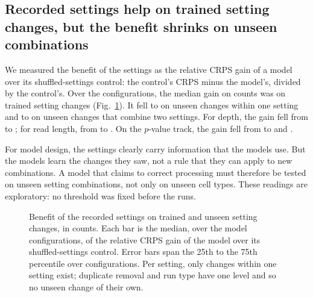 \documentclass[pdflatex,sn-mathphys-num]{sn-jnl}
\newcommand{\lit}[1]{#1}
\begin{document}
\subsection{Recorded settings help on trained setting changes, but the benefit shrinks on unseen combinations}\label{sec:r4}

We measured the benefit of the settings as the relative CRPS gain of a model over its
shuffled-settings control: the control's CRPS minus the model's, divided by the control's.
Over the \nGenCfg{} configurations, the median gain on counts was \relCntTr{} on trained
setting changes (Fig.~\ref{fig:gen}). It fell to \relCntSame{} on unseen changes within one
setting and to \relCntCross{} on unseen changes that combine two settings. For depth, the gain
fell from \genDepthTr{} to \genDepthSame{}; for read length, from \genCropTr{} to
\genCropSame{}. On the $p$-value track, the gain fell from \relPTr{} to \relPSame{} and
\relPCross{}.

For model design, the settings clearly carry information that the models use. But the models
learn the changes they saw, not a rule that they can apply to new combinations. A model that
claims to correct processing must therefore be tested on unseen setting combinations, not only
on unseen cell types. These readings are exploratory: no threshold was fixed before the runs.

\begin{figure}[t]
\centering
{}
\caption{Benefit of the recorded settings on trained and unseen setting changes, in counts.
Each bar is the median, over the \nGenCfg{} model configurations, of the relative CRPS gain of
the model over its shuffled-settings control. Error bars span the \lit{25}th to the \lit{75}th percentile
over configurations. Per setting, only changes within one setting exist; duplicate removal and
run type have one level and so no unseen change of their own.}\label{fig:gen}
\end{figure}
\end{document}
